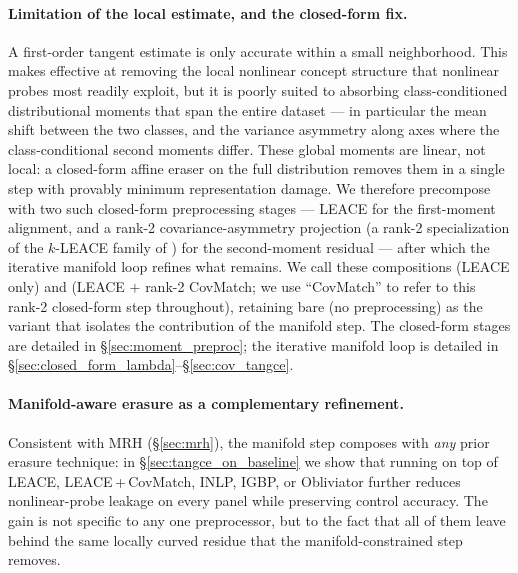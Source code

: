 \paragraph{Limitation of the local estimate, and the closed-form fix.}
A first-order tangent estimate is only accurate within a small neighborhood. This makes \TanGCE{} effective at removing the local nonlinear concept structure that nonlinear probes most readily exploit, but it is poorly suited to absorbing class-conditioned distributional moments that span the entire dataset --- in particular the mean shift between the two classes, and the variance asymmetry along axes where the class-conditional second moments differ. These global moments are linear, not local: a closed-form affine eraser on the full distribution removes them in a single step with provably minimum representation damage. We therefore precompose \TanGCE{} with two such closed-form preprocessing stages --- LEACE \citep{belrose-etal-2023-leace} for the first-moment alignment, and a rank-2 covariance-asymmetry projection (a rank-2 specialization of the $k$-LEACE family of \citealt{singh-ravfogel-2024-representation-surgery}) for the second-moment residual --- after which the iterative manifold loop refines what remains. We call these compositions \TanGCEp{} (LEACE only) and \TanGCEpp{} (LEACE $+$ rank-2 CovMatch; we use ``CovMatch'' to refer to this rank-2 closed-form step throughout), retaining bare \TanGCE{} (no preprocessing) as the variant that isolates the contribution of the manifold step. The closed-form stages are detailed in §\ref{sec:moment_preproc}; the iterative manifold loop is detailed in §\ref{sec:closed_form_lambda}--§\ref{sec:cov_tangce}.

\paragraph{Manifold-aware erasure as a complementary refinement.}
Consistent with MRH (§\ref{sec:mrh}), the manifold step composes with \emph{any} prior erasure technique: in §\ref{sec:tangce_on_baseline} we show that running \TanGCE{} on top of LEACE, LEACE\,+\,CovMatch, INLP, IGBP, or Obliviator further reduces nonlinear-probe leakage on every panel while preserving control accuracy. The gain is not specific to any one preprocessor, but to the fact that all of them leave behind the same locally curved residue that the manifold-constrained step removes.


